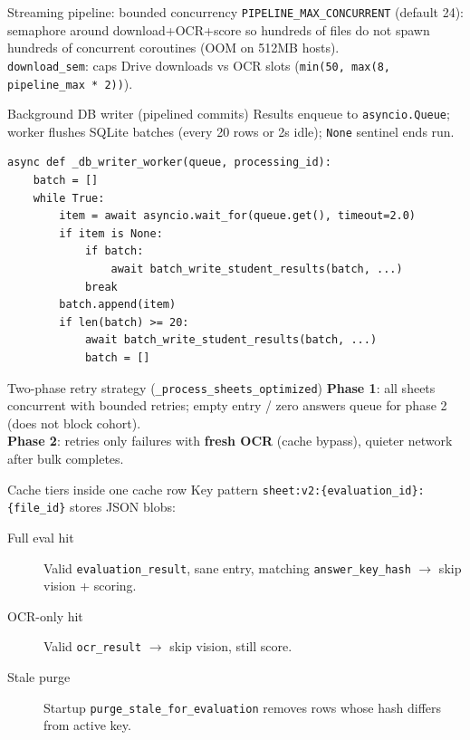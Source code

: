 \documentclass[aspectratio=169]{beamer}
\begin{document}
\begin{frame}{Streaming pipeline: bounded concurrency}
  \small
  \texttt{PIPELINE\_MAX\_CONCURRENT} (default 24): semaphore around download+OCR+score so hundreds of files do not spawn hundreds of concurrent coroutines (OOM on 512MB hosts).\\
  \texttt{download\_sem}: caps Drive downloads vs OCR slots (\texttt{min(50, max(8, pipeline\_max * 2))}).
\end{frame}

\begin{frame}[fragile]{Background DB writer (pipelined commits)}
  \footnotesize
  Results enqueue to \texttt{asyncio.Queue}; worker flushes SQLite batches (every 20 rows or 2s idle); \texttt{None} sentinel ends run.
\begin{lstlisting}[style=py]
async def _db_writer_worker(queue, processing_id):
    batch = []
    while True:
        item = await asyncio.wait_for(queue.get(), timeout=2.0)
        if item is None:
            if batch:
                await batch_write_student_results(batch, ...)
            break
        batch.append(item)
        if len(batch) >= 20:
            await batch_write_student_results(batch, ...)
            batch = []
\end{lstlisting}
\end{frame}

\begin{frame}{Two-phase retry strategy (\texttt{\_process\_sheets\_optimized})}
  \small
  \textbf{Phase 1}: all sheets concurrent with bounded retries; empty entry / zero answers queue for phase 2 (does not block cohort).\\
  \textbf{Phase 2}: retries only failures with \textbf{fresh OCR} (cache bypass), quieter network after bulk completes.
\end{frame}

\begin{frame}{Cache tiers inside one cache row}
  \small
  Key pattern \texttt{sheet:v2:\{evaluation\_id\}:\{file\_id\}} stores JSON blobs:\\[0.4em]
  \begin{description}
    \item[Full eval hit] Valid \texttt{evaluation\_result}, sane entry, matching \texttt{answer\_key\_hash} $\rightarrow$ skip vision + scoring.
    \item[OCR-only hit] Valid \texttt{ocr\_result} $\rightarrow$ skip vision, still score.
    \item[Stale purge] Startup \texttt{purge\_stale\_for\_evaluation} removes rows whose hash differs from active key.
  \end{description}
\end{frame}
\end{document}
